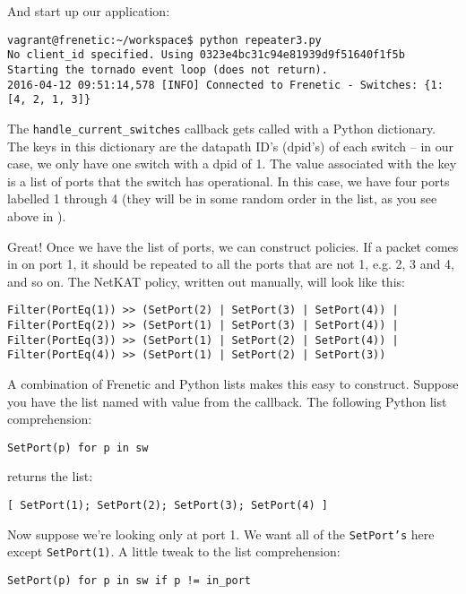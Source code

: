 And start up our application:

\begin{verbatim}
vagrant@frenetic:~/workspace$ python repeater3.py
No client_id specified. Using 0323e4bc31c94e81939d9f51640f1f5b
Starting the tornado event loop (does not return).
2016-04-12 09:51:14,578 [INFO] Connected to Frenetic - Switches: {1: [4, 2, 1, 3]}
\end{verbatim}

The \texttt{handle\_current\_switches} callback gets called with a Python dictionary.  
The keys in this dictionary are the datapath ID's (dpid's) of each switch -- in our case, we only have
one switch with a dpid of 1.
The value associated with the key is a list of ports that the switch has operational.  
In this case, we have four ports labelled 1 through 4 (they will be in some random order in the list, as
you see above in \python{[4, 2, 1, 3]}).

Great!  Once we have the list of ports, we can construct policies.  If a packet comes in on port
1, it should be repeated to all the ports that are not 1, e.g. 2, 3 and 4, and so on.   
The NetKAT policy, written out manually, will look like this:

\begin{verbatim}
Filter(PortEq(1)) >> (SetPort(2) | SetPort(3) | SetPort(4)) |
Filter(PortEq(2)) >> (SetPort(1) | SetPort(3) | SetPort(4)) |
Filter(PortEq(3)) >> (SetPort(1) | SetPort(2) | SetPort(4)) |
Filter(PortEq(4)) >> (SetPort(1) | SetPort(2) | SetPort(3))
\end{verbatim}

A combination of Frenetic and Python lists makes this easy to construct.  
Suppose you have the list named  with value 
\python{[1, 2, 3, 4]} from the callback.   The following Python list comprehension:

\begin{verbatim}
SetPort(p) for p in sw
\end{verbatim}

returns the list:

\begin{verbatim}
[ SetPort(1); SetPort(2); SetPort(3); SetPort(4) ]
\end{verbatim}

Now suppose we're looking only at port 1.  We want all of the \texttt{SetPort's} here 
except \texttt{SetPort(1)}.  A little tweak to the list comprehension:

\begin{verbatim}
SetPort(p) for p in sw if p != in_port
\end{verbatim}


